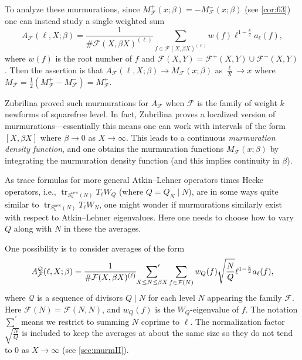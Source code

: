 \documentclass[11pt]{amsart}
\newcommand{\new}{\mathrm{new}}
\DeclareMathOperator{\tr}{tr}
\numberwithin{lem}{section}
\theoremstyle{remark}
\theoremstyle{definition}
\numberwithin{equation}{section}
\begin{document}
To analyze these murmurations, since $M^+_{\mathcal F}(x; \beta) = -M^-_{\mathcal F}(x; \beta)$ (see \cref{cor:63}) one can instead study a single weighted sum
\begin{equation} \label{eq:drew-avgs}
 A_{\mathcal F}(\ell,X; \beta) = \frac 1{\#\mathcal F(X,\beta X)^{(\ell)}}\sum_{f \in \mathcal F(X,\beta X)^{(\ell)}} w(f) \ell^{1 - \frac k2} a_\ell(f), 
\end{equation}
where $w(f)$ is the root number of $f$ and $\mathcal F(X,Y) =
\mathcal F^{+}(X,Y) \cup \mathcal F^{-}(X,Y)$.  
Then the assertion is that $A_{\mathcal F}(\ell,X; \beta) \to M_{\mathcal F}(x; \beta)$ as $\frac \ell X \to x$ where $M_{\mathcal F} = \frac 12( M^+_{\mathcal F} - M^-_{\mathcal F}) = M^+_{\mathcal F}$.

Zubrilina \cite{zubrilina} proved such murmurations for $A_{\mathcal F}$ when $\mathcal F$ is the family of weight $k$ newforms of squarefree level.  In fact, Zubrilina proves a localized version of murmurations---essentially this means one can work with intervals of the form $[X, \beta X]$ where $\beta \to 0$ as $X \to \infty$.  This leads to a continuous \emph{murmuration density function}, and one obtains the murmuration functions $M_{\mathcal F}(x; \beta)$  by integrating the murmuration density function (and this implies continuity in $\beta$).

As trace formulas for more general Atkin--Lehner operators times Hecke operators, i.e., $\tr_{S_k^\new(N)} T_\ell W_Q$ (where $Q = Q_N \mid N$), are in some ways quite similar to $\tr_{S_k^\new(N)} T_\ell W_N$, one might wonder if murmurations similarly exist with respect to Atkin--Lehner eigenvalues.  Here one needs to choose how to vary $Q$ along with $N$ in these the averages.

One possibility is to consider averages of the form
\begin{equation} \label{eq:gen-avgs}
A^{\mathcal Q}_{\mathcal F}(\ell,X; \beta) = \frac 1{\#\mathcal F(X,\beta X)^{(\ell)}} \sideset{}{'}\sum_{X \le N \le \beta X} \sum_{f \in \mathcal F(N)} w_Q(f) \sqrt{\frac NQ}  \ell^{1 - \frac k2} a_\ell(f),
\end{equation}
where $\mathcal Q$ is a sequence of divisors $Q \mid N$ for each level $N$ appearing the family $\mathcal F$.  Here $\mathcal F(N) = \mathcal F(N,N)$, and $w_Q(f)$ is the $W_Q$-eigenvalue of $f$.  The notation $\sum^\prime$ means we restrict to summing $N$ coprime to $\ell$.  The normalization factor $\sqrt{\frac N Q}$ is included to keep the averages at about the same size so they do not tend to $0$ as $X \to \infty$ (see \cref{sec:murmII}).
\end{document}
